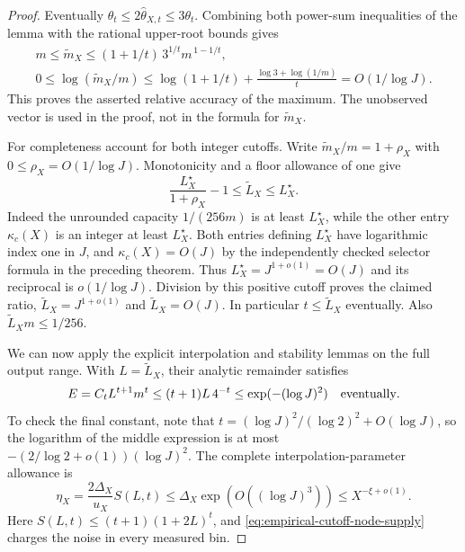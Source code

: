 \documentclass[11pt]{article}
\theoremstyle{definition}
\begin{document}
\begin{proof}
Eventually $\theta_t\le2\widehat\theta_{X,t}\le3\theta_t$.
Combining both power-sum inequalities of the lemma with
the rational upper-root bounds gives
\begin{equation}
 \begin{gathered}
 m\le\widetilde m_X
       \le(1+1/t)\,3^{1/t}m^{\,1-1/t},\\
 0\le\log(\widetilde m_X/m)
       \le\log(1+1/t)+\frac{\log3+\log(1/m)}t
       =O(1/\log J).
 \end{gathered}
 \label{eq:empirical-cutoff-largest-coordinate}
\end{equation}
This proves the asserted relative accuracy of the maximum.
The unobserved vector is used in the proof, not in the formula
for $\widetilde m_X$.

For completeness account for both integer cutoffs.
Write $\widetilde m_X/m=1+\rho_X$ with
$0\le\rho_X=O(1/\log J)$.
Monotonicity and a floor allowance of one give
\[
  \frac{L_X^\star}{1+\rho_X}-1
           \le\widetilde L_X\le L_X^\star .
\]
Indeed the unrounded capacity $1/(256m)$ is at least
$L_X^\star$, while the other entry $\kappa_c(X)$ is an integer
at least $L_X^\star$.
Both entries defining $L_X^\star$ have logarithmic index one
in $J$, and $\kappa_c(X)=O(J)$ by the independently checked
selector formula in the preceding theorem.
Thus $L_X^\star=J^{1+o(1)}=O(J)$ and its reciprocal is
$o(1/\log J)$.
Division by this positive cutoff proves the claimed ratio,
$\widetilde L_X=J^{1+o(1)}$ and $\widetilde L_X=O(J)$.
In particular $t\le\widetilde L_X$ eventually.
Also $\widetilde L_Xm\le1/256$.

We can now apply the explicit interpolation and stability
lemmas on the full output range.
With $L=\widetilde L_X$, their analytic remainder satisfies
\begin{equation}
 E=C_tL^{t+1}m^t
       \le(t+1)L\,4^{-t}
       \le\exp(-(\log J)^2)
                         \quad\hbox{eventually}.
 \label{eq:empirical-cutoff-superpolynomial-remainder}
\end{equation}
To check the final constant, note that
$t=(\log J)^2/(\log2)^2+O(\log J)$, so the logarithm
of the middle expression is at most
$-(2/\log2+o(1))(\log J)^2$.
The complete interpolation-parameter allowance is
\begin{equation}
 \eta_X=\frac{2\Delta_X}{u_X}S(L,t)
       \le\Delta_X\exp(O((\log J)^3))
       \le X^{-\xi+o(1)} .
 \label{eq:empirical-cutoff-parameter-allowance}
\end{equation}
Here $S(L,t)\le(t+1)(1+2L)^t$, and
\eqref{eq:empirical-cutoff-node-supply} charges the noise in
every measured bin.


\end{proof}
\end{document}
